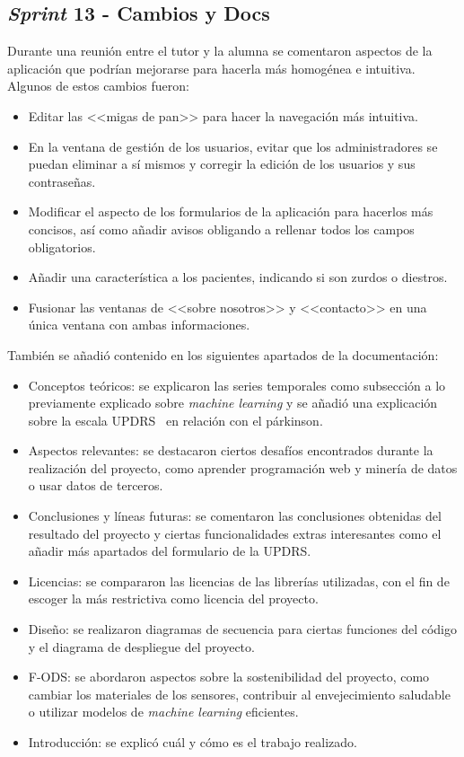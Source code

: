 \subsection{\textit{Sprint} 13 - Cambios y Docs}
Durante una reunión entre el tutor y la alumna se comentaron aspectos de la aplicación que podrían mejorarse para hacerla más homogénea e intuitiva. Algunos de estos cambios fueron:
\begin{itemize}
    \item Editar las <<migas de pan>> para hacer la navegación más intuitiva.
    \item En la ventana de gestión de los usuarios, evitar que los administradores se puedan eliminar a sí mismos y corregir la edición de los usuarios y sus contraseñas.
    \item Modificar el aspecto de los formularios de la aplicación para hacerlos más concisos, así como añadir avisos obligando a rellenar todos los campos obligatorios.
    \item Añadir una característica a los pacientes, indicando si son zurdos o diestros.
    \item Fusionar las ventanas de <<sobre nosotros>> y <<contacto>> en una única ventana con ambas informaciones.
\end{itemize}

También se añadió contenido en los siguientes apartados de la documentación:
\begin{itemize}
    \item Conceptos teóricos: se explicaron las series temporales como subsección a lo previamente explicado sobre \textit{machine learning} y se añadió una explicación sobre la escala UPDRS~\cite{updrs} en relación con el párkinson.
    \item Aspectos relevantes: se destacaron ciertos desafíos encontrados durante la realización del proyecto, como aprender programación web y minería de datos o usar datos de terceros.
    \item Conclusiones y líneas futuras: se comentaron las conclusiones obtenidas del resultado del proyecto y ciertas funcionalidades extras interesantes como el añadir más apartados del formulario de la UPDRS.
    \item Licencias: se compararon las licencias de las librerías utilizadas, con el fin de escoger la más restrictiva como licencia del proyecto.
    \item Diseño: se realizaron diagramas de secuencia para ciertas funciones del código y el diagrama de despliegue del proyecto.
    \item F-ODS: se abordaron aspectos sobre la sostenibilidad del proyecto, como cambiar los materiales de los sensores, contribuir al envejecimiento saludable o utilizar modelos de \textit{machine learning} eficientes.
    \item Introducción: se explicó cuál y cómo es el trabajo realizado.
\end{itemize}

